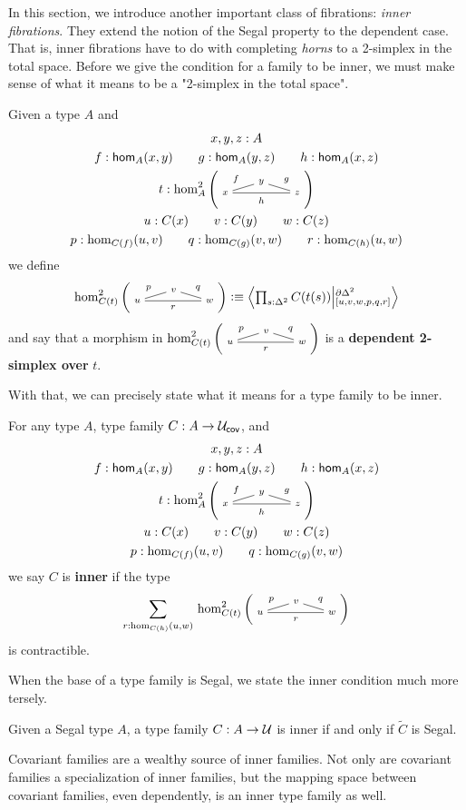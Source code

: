 \documentclass[main.tex]{subfiles}
\begin{document}
In this section, we introduce another important class of fibrations: \textit{inner fibrations}. They extend the notion of the Segal property to the dependent case. That is, 
inner fibrations have to do with completing \textit{horns} to a 2-simplex in the total space. Before we give the condition for a family
to be inner, we must make sense of what it means to be a "2-simplex in the total space".
\begin{definition}
    Given a type $A$ and
    \begin{gather*}
                          x,y,z : A  \\
    f : \ho[A]{x}{y} \qquad g : \ho[A]{y}{z} \qquad h:\ho[A]{x}{z} \\
    t : \homtwo{A}(x,y,z,f,g,h)\\
    u : C(x) \qquad v : C(y) \qquad w : C(z) \\
    p : \dho{C}{f}{u}{v} \qquad q : \dho{C}{g}{v}{w} \qquad r : \dho{C}{h}{u}{w}
    \end{gather*}
    we define
    $$\homtwo{C(t)}(u,v,w,p,q,r) \defeq \exten{s : \tsx}{C(t(s))}{\pardt}{[u,v,w,p,q,r]}$$
    and say that a morphism in $\homtwo{C(t)}(u,v,w,p,q,r)$ is a \textbf{dependent 2-simplex over} $t$.
\end{definition}
With that, we can precisely state what it means for a type family to be inner.

\begin{definition}
    For any type $A$, type family $C : A \to \mathcal{U}_\mathsf{cov}$, and
    \begin{gather*}
    x,y,z : A  \\
    f : \ho[A]{x}{y} \qquad g : \ho[A]{y}{z} \qquad h:\ho[A]{x}{z} \\
    t : \homtwo{A}(x,y,z,f,g,h)\\
    u : C(x) \qquad v : C(y) \qquad w : C(z) \\
    p : \dho{C}{f}{u}{v} \qquad q : \dho{C}{g}{v}{w}  
    \end{gather*}
    we say $C$ is \textbf{inner} if the type 
    \begin{equation}
        \sm{r : \dho{C}{h}{u}{w}}\homtwo{C(t)}(u,v,w,p,q,r)
    \end{equation}
    is contractible.
\end{definition}

When the base of a type family is Segal, we state the inner condition much more tersely.
\begin{lemma}
    \label{lem:totbaseseginner}
    Given a Segal type $A$, a type family $C : A \to \mathcal{U}$ is inner if and only if $\widetilde{C}$ is Segal.
\end{lemma}
Covariant families are a wealthy source of inner families. Not only are covariant families a specialization of inner families, but the mapping space between covariant families, even dependently, is an inner type family as well. 
\end{document}
